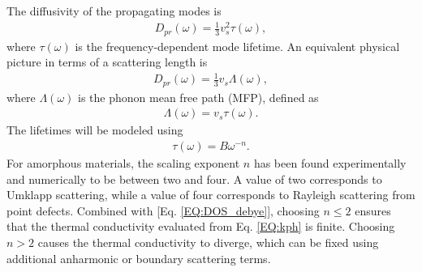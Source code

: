 \documentclass[aps,prb,onecolumn,preprint,superscriptaddress,footinbib,amsmath,amssymb,floatfix]{revtex4}
\begin{document}
The diffusivity of the propagating modes is    
\begin{equation}\label{EQ:Dtau}
\begin{split}
D_{pr}(\omega) = \frac{1}{3}v^2_s\tau(\omega),
\end{split}
\end{equation}
where $\tau(\omega)$ is the frequency-dependent mode 
lifetime.\cite{ziman_electrons_2001} An equivalent physical 
picture in terms of a scattering length is
\begin{equation}\label{EQ:DLambda}
\begin{split}
D_{pr}(\omega) = \frac{1}{3}v_s \Lambda(\omega),
\end{split}
\end{equation}
where $\Lambda(\omega)$ is the phonon mean free path (MFP), defined as 
\begin{equation}\label{EQ:Lambda}
\begin{split}
\Lambda(\omega) = v_{s} \tau(\omega).
\end{split}
\end{equation}
The lifetimes will be modeled using 
\begin{equation}\label{EQ:tauw2}
\begin{split}
\tau(\omega) = B \omega^{-n}.
\end{split}
\end{equation}
For amorphous materials, the scaling exponent $n$ 
has been found experimentally and numerically to be 
between two and four.
\cite{
feldman_thermal_1993,morath_phonon_1996,benassi_evidence_1996,
feldman_numerical_1999,taraskin_determination_1999,
taraskin_propagation_2000,gotze_evolution_2000,ruocco_relaxation_2000,
ruocco_high-frequency_2001,horbach_high_2001,
matic_sound_2001,
feldman_calculations_2002,ruffle_observation_2003,
masciovecchio_evidence_2006,schirmacher_acoustic_2007,
christie_vibrational_2007,
shintani_universal_2008,xu_energy_2009,
liu_high_2009,ganter_rayleigh_2010,
vitelli_heat_2010,
baldi_sound_2010,yang_anomalously_2010,
wyart_scaling_2010,baldi_elastic_2011,
he_heat_2011,ayrinhac_subterahertz_2011,
baldi_emergence_2013}
A value of two corresponds to 
Umklapp scattering,\cite{callaway_model_1959} while a value of four 
corresponds to 
Rayleigh scattering from point defects.\cite{klemens_scattering_1955}
Combined with [Eq. \eqref{EQ:DOS_debye}], choosing $n\le2$ ensures 
that the thermal conductivity evaluated from Eq. \eqref{EQ:kph} is finite. 
Choosing $n>2$ causes the thermal conductivity to diverge,   
which can be fixed using additional anharmonic
\cite{feldman_thermal_1993,feldman_numerical_1999} 
or boundary scattering terms.
\cite{cahill_thermal_1994,liu_high_2009,yang_anomalously_2010}
\end{document}
